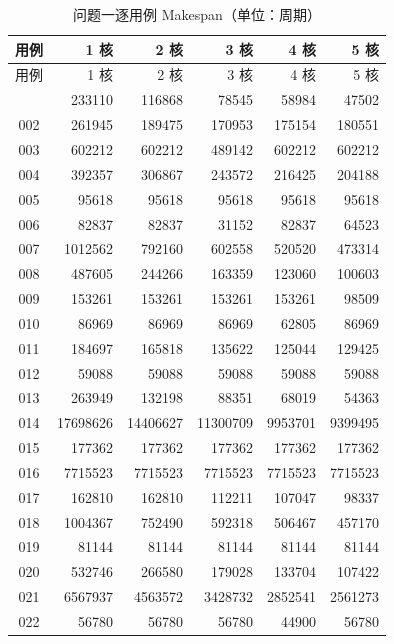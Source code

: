 \scriptsize
\setlength{\tabcolsep}{2.5pt}
\renewcommand{\arraystretch}{0.95}
\begin{longtable}{|c|r|r|r|r|r|}
\caption{问题一逐用例 Makespan（单位：周期）}\label{tab:q1_makespan}\\
\hline
用例 & 1 核 & 2 核 & 3 核 & 4 核 & 5 核 \\
\hline
\endfirsthead
\hline
用例 & 1 核 & 2 核 & 3 核 & 4 核 & 5 核 \\
\hline
\endhead
\hline
\endfoot
001 & 233110 & 116868 & 78545 & 58984 & 47502 \\
\hline
002 & 261945 & 189475 & 170953 & 175154 & 180551 \\
\hline
003 & 602212 & 602212 & 489142 & 602212 & 602212 \\
\hline
004 & 392357 & 306867 & 243572 & 216425 & 204188 \\
\hline
005 & 95618 & 95618 & 95618 & 95618 & 95618 \\
\hline
006 & 82837 & 82837 & 31152 & 82837 & 64523 \\
\hline
007 & 1012562 & 792160 & 602558 & 520520 & 473314 \\
\hline
008 & 487605 & 244266 & 163359 & 123060 & 100603 \\
\hline
009 & 153261 & 153261 & 153261 & 153261 & 98509 \\
\hline
010 & 86969 & 86969 & 86969 & 62805 & 86969 \\
\hline
011 & 184697 & 165818 & 135622 & 125044 & 129425 \\
\hline
012 & 59088 & 59088 & 59088 & 59088 & 59088 \\
\hline
013 & 263949 & 132198 & 88351 & 68019 & 54363 \\
\hline
014 & 17698626 & 14406627 & 11300709 & 9953701 & 9399495 \\
\hline
015 & 177362 & 177362 & 177362 & 177362 & 177362 \\
\hline
016 & 7715523 & 7715523 & 7715523 & 7715523 & 7715523 \\
\hline
017 & 162810 & 162810 & 112211 & 107047 & 98337 \\
\hline
018 & 1004367 & 752490 & 592318 & 506467 & 457170 \\
\hline
019 & 81144 & 81144 & 81144 & 81144 & 81144 \\
\hline
020 & 532746 & 266580 & 179028 & 133704 & 107422 \\
\hline
021 & 6567937 & 4563572 & 3428732 & 2852541 & 2561273 \\
\hline
022 & 56780 & 56780 & 56780 & 44900 & 56780 \\

\end{longtable}
